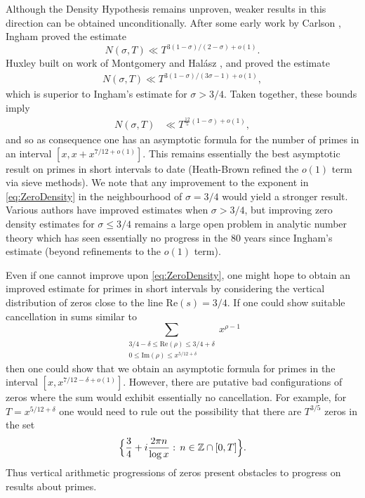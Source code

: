 \documentclass[12pt]{amsart}
\theoremstyle{plain}
\theoremstyle{definition}
\theoremstyle{remark}
\begin{document}
Although the Density Hypothesis remains unproven, weaker results in this direction can be obtained unconditionally. After some early work by Carlson \cite{Car1921}, Ingham \cite{Ing1940} proved the estimate
%
\begin{equation}
N(\sigma,T) \ll T^{3(1-\sigma)/(2-\sigma)+o(1)}.
\label{eq:InghamEstimate}
\end{equation}
%
Huxley \cite{Hux1972} built on work of Montgomery \cite{Mon1971} and Hal\'asz \cite{Hal1968}, and proved the estimate
%
\begin{align}
N(\sigma,T) \ll T^{3(1-\sigma)/(3\sigma-1)+o(1)},
\label{eq:HuxleyEstimate}
\end{align}
%
which is superior to Ingham's estimate for $\sigma> 3/4$. Taken together, these bounds imply 
%
\begin{align}
N(\sigma,T) &\ll T^{\frac{12}{5}(1-\sigma)+o(1)},\label{eq:ZeroDensity}
\end{align}
%
and so as  consequence one has an asymptotic formula for the number of primes in an interval $[x,x+x^{7/12+o(1)}]$. This remains essentially the best asymptotic result on primes in short intervals to date (Heath-Brown \cite{HB1988} refined the $o(1)$ term via sieve methods). We note that any improvement to the exponent in \eqref{eq:ZeroDensity} in the neighbourhood of $\sigma=3/4$ would yield a stronger result. Various authors have improved estimates when $\sigma>3/4$, but improving zero density estimates for $\sigma\le 3/4$ remains a large open problem in analytic number theory which has seen essentially no progress in the 80 years since Ingham's estimate (beyond refinements to the $o(1)$ term).

Even if one cannot improve upon \eqref{eq:ZeroDensity}, one might hope to obtain an improved estimate for primes in short intervals by considering the vertical distribution of zeros close to the line $\text{Re}(s)=3/4$. If one could show suitable cancellation in sums similar to
\[
\sum_{\substack{3/4-\delta\le\text{Re}(\rho)\le 3/4+\delta\\ 0\le \text{Im}(\rho)\le x^{5/12+\delta} }}x^{\rho-1}
\]
then one could show that we obtain an asymptotic formula for primes in the interval $[x,x^{7/12-\delta+o(1)}]$. However, there are putative bad configurations of zeros where the sum would exhibit essentially no cancellation. For example, for $T= x^{5/12+\delta}$ one would need to rule out the possibility that there are $T^{3/5}$ zeros in the set 
\[
\Bigl\{\frac{3}{4}+i\frac{2\pi n}{\log{x}}:\,n\in \mathbb{Z}\cap[0,T]\Bigr\}.
\]
Thus vertical arithmetic progressions of zeros present obstacles to progress on results about primes.  
\end{document}
